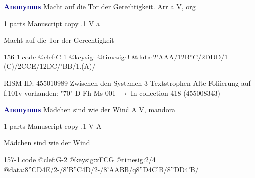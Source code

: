 \documentclass[twocolumn]{book}
\begin{document}
\newline \par \vspace{7pt} \textcolor{darkblue}{\textbf{Anonymus  }}
\newline Macht auf die Tor der Gerechtigkeit. Arr  a  
\newline V, org
\newline \begin{itshape}\end{itshape} 
\newline \textcolor{darkblue}{}  1 parts  
\newline Manuscript copy
.1  V  a
\newline \begin{footnotesize} Macht auf die Tor der Gerechtigkeit \end{footnotesize}  
\begin{filecontents*}{156-1.code}
@clef:C-1
@keysig:
@timesig:3
@data:2'AAA/12B''C/2DDD/1.(C)/2CCE/12DC/'BB/1.(A)/
\end{filecontents*}
\newline
%

\newline RISM-ID: 455010989
\newline Zwischen den Systemen 3 Textstrophen
\newline Alte Foliierung auf f.101v vorhanden: "70"
\newline D-Fh  Ms 001
\newline $\rightarrow$ In collection 418 (455008343)

\newline \par \vspace{7pt} \textcolor{darkblue}{\textbf{Anonymus  }}
\newline Mädchen sind wie der Wind  A  
\newline V, mandora
\newline \begin{itshape}\end{itshape} 
\newline \textcolor{darkblue}{}  1 parts  
\newline Manuscript copy
.1  V  A
\newline \begin{footnotesize} Mädchen sind wie der Wind \end{footnotesize}  
\begin{filecontents*}{157-1.code}
@clef:G-2
@keysig:xFCG
@timesig:2/4
@data:8''CD4E/2-/8'B''C4D/2-/8'AABB/q8''D4C'B/8''DD4'B/
\end{filecontents*}
\newline
%
\end{document}
